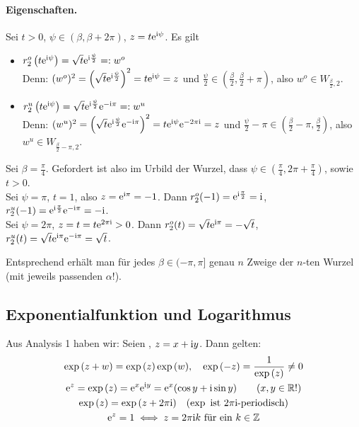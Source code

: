 \documentclass[a4paper,twoside,DIV15,BCOR12mm]{scrbook}
\begin{document}
\paragraph{Eigenschaften.} Sei $t>0$, $\psi\in(\beta,\beta+2\pi)$, $z=t\mathrm{e}^{\mathrm{i}\psi}$. Es gilt
\begin{itemize}
\item $r_2^o\left(t\mathrm{e}^{\mathrm{i}\psi}\right) = \sqrt{t}\mathrm{e}^{\mathrm{i}\frac\psi2} =: w^o$\\
  Denn: $(w^o)^2 = \left(\sqrt{t}\mathrm{e}^{\mathrm{i}\frac\psi2}\right)^2 = t\mathrm{e}^{\mathrm{i}\psi} = z$ und $\frac\psi2 \in
  (\frac\beta2,\frac\beta2+\pi)$, also $w^o\in W_{\frac\beta2,2}$.
\item $r_2^u\left(t\mathrm{e}^{\mathrm{i}\psi}\right) = \sqrt{t}\mathrm{e}^{\mathrm{i}\frac\psi2}\mathrm{e}^{-\mathrm{i}\pi} =: w^u$\\
  Denn: $(w^u)^2 = \left(\sqrt{t}\mathrm{e}^{\mathrm{i}\frac\psi2}\mathrm{e}^{-\mathrm{i}\pi}\right)^2 = t\mathrm{e}^{\mathrm{i}\psi}\mathrm{e}^{-2\pi\mathrm{i}} = z$ und $\frac\psi2-\pi \in
  (\frac\beta2-\pi,\frac\beta2)$, also $w^u\in W_{\frac\beta2-\pi,2}$.
\end{itemize}

\begin{bsp*}
  Sei $\beta=\frac\pi4$. Gefordert ist also im Urbild der Wurzel, dass $\psi\in(\frac\pi4,2\pi+\frac\pi4)$, sowie $t>0$.\\
  Sei $\psi=\pi$, $t=1$, also $z=\mathrm{e}^{\mathrm{i}\pi}=-1$. Dann $r^o_2(-1)=\mathrm{e}^{\mathrm{i}\frac\pi2}=\mathrm{i}$,
  $r^u_2(-1)=\mathrm{e}^{\mathrm{i}\frac\pi2}\mathrm{e}^{-\mathrm{i}\pi}=-\mathrm{i}$. \\
  Sei $\psi=2\pi$, $z=t=t\mathrm{e}^{2\pi\mathrm{i}}>0$. Dann $r^o_2(t) = \sqrt{t}\mathrm{e}^{\mathrm{i}\pi} = -\sqrt{t}$, $r^u_2(t) =
  \sqrt{t}\mathrm{e}^{\mathrm{i}\pi}\mathrm{e}^{-\mathrm{i}\pi} = \sqrt{t}$.
\end{bsp*}

\noindent Entsprechend erhält man für jedes $\beta\in(-\pi,\pi]$ genau $n$ Zweige der $n$-ten Wurzel (mit jeweils passenden $\alpha$!).


\subsection{Exponentialfunktion und Logarithmus}

Aus Analysis 1 haben wir: Seien , $z=x+\mathrm{i} y$. Dann gelten:
\begin{gather}
  \exp{(z+w)}=\exp{(z)}\exp{(w)}, \quad \exp{(-z)} = \frac{1}{\exp{(z)}} \neq 0 \label{eqn1.6} \\
  \mathrm{e}^z = \exp{(z)} = \mathrm{e}^x\mathrm{e}^{\mathrm{i} y} = \mathrm{e}^x(\cos{y}+\mathrm{i}\sin{y}) \quad \quad (x,y\in\mathbb{R}!) \label{eqn1.7} \\
  \exp{(z)} = \exp{(z+2\pi\mathrm{i})} \quad (\exp \text{ ist } 2\pi\mathrm{i}\text{-periodisch}) \label{eqn1.8} \\
  \mathrm{e}^z=1 \iff z=2\pi\mathrm{i} k \text{ für ein } k\in\mathbb{Z} \label{eqn1.9}
\end{gather}
\end{document}
